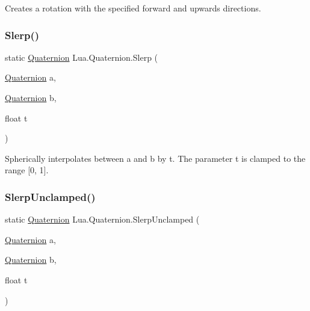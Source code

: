 Creates a rotation with the specified forward and upwards directions. 

\mbox{\label{class_lua_1_1_quaternion_a8848906e3924791706bc0bc853a4572b}} 
\subsubsection{\texorpdfstring{Slerp()}{Slerp()}}
{\footnotesize\ttfamily static \mbox{\hyperlink{class_lua_1_1_quaternion}{Quaternion}} Lua.\+Quaternion.\+Slerp (\begin{DoxyParamCaption}\item[{\mbox{\hyperlink{class_lua_1_1_quaternion}{Quaternion}}}]{a,  }\item[{\mbox{\hyperlink{class_lua_1_1_quaternion}{Quaternion}}}]{b,  }\item[{float}]{t }\end{DoxyParamCaption})\hspace{0.3cm}{\ttfamily [static]}}



Spherically interpolates between a and b by t. The parameter t is clamped to the range \mbox{[}0, 1\mbox{]}. 

\mbox{\label{class_lua_1_1_quaternion_a5056ad858477a4b81765167a068d5379}} 
\subsubsection{\texorpdfstring{SlerpUnclamped()}{SlerpUnclamped()}}
{\footnotesize\ttfamily static \mbox{\hyperlink{class_lua_1_1_quaternion}{Quaternion}} Lua.\+Quaternion.\+Slerp\+Unclamped (\begin{DoxyParamCaption}\item[{\mbox{\hyperlink{class_lua_1_1_quaternion}{Quaternion}}}]{a,  }\item[{\mbox{\hyperlink{class_lua_1_1_quaternion}{Quaternion}}}]{b,  }\item[{float}]{t }\end{DoxyParamCaption})\hspace{0.3cm}{\ttfamily [static]}}



